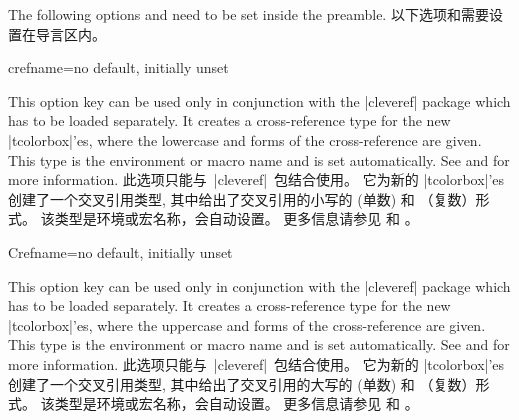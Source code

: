 \begin{marker}
\begin{stripedbox}[blank]
The following options  and 
need to be set inside the preamble.
\tcblower
以下选项和需要设置在导言区内。
\end{stripedbox}
\end{marker}

\begin{newTcbKey}[][doc updated=2014-12-01]{crefname}{=}{no default, initially unset}
\begin{stripedbox}
This option key can be used only in conjunction with the |cleveref| package
which has to be loaded separately.
It creates a cross-reference type for the new |tcolorbox|'es, where the
lowercase  and  forms of the cross-reference are given.
This type is the environment or macro name and  is set automatically.
See  and \cite{cubitt:2018a} 
for more information.
\tcblower
此选项只能与~|cleveref|~包结合使用。%
它为新的 |tcolorbox|'es 创建了一个交叉引用类型, %
其中给出了交叉引用的小写的 (单数) 和 （复数）形式。%
该类型是环境或宏名称，会自动设置。%
更多信息请参见  和 \cite{cubitt:2018a}。
\end{stripedbox}
\end{newTcbKey}

\begin{newTcbKey}[][doc updated=2014-12-01]{Crefname}{=}{no default, initially unset}
\begin{stripedbox}
This option key can be used only in conjunction with the |cleveref| package
\cite{cubitt:2018a} which has to be loaded separately.
It creates a cross-reference type for the new |tcolorbox|'es, where the
uppercase  and  forms of the cross-reference are given.
This type is the environment or macro name and  is set automatically.
See  and \cite{cubitt:2018a} for more information.
\tcblower
此选项只能与~|cleveref|~包结合使用。%
它为新的 |tcolorbox|'es 创建了一个交叉引用类型, %
其中给出了交叉引用的大写的 (单数) 和 （复数）形式。%
该类型是环境或宏名称，会自动设置。%
更多信息请参见  和 \cite{cubitt:2018a}。
\end{stripedbox}
\end{newTcbKey}

